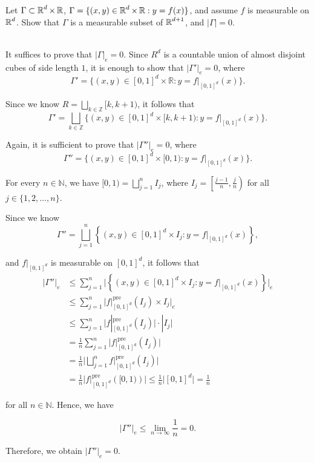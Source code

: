\documentclass[UTF8,a4paper,10pt]{article}
\begin{document}
\pagebreak

\begin{Problem}[]{}
  Let \(\Gamma\subset \operatorname{\mathbb{R}}^d \times\operatorname{\mathbb{R}}\), \(\Gamma = \{(x,y)\in\operatorname{\mathbb{R}}^d\times\operatorname{\mathbb{R}}:y = f(x)\}\), and assume \(f\) is measurable on \(\operatorname{\mathbb{R}}^d\). Show that \(\Gamma\) is a measurable subset of \(\operatorname{\mathbb{R}}^{d+1}\), and \(|\Gamma| = 0.\)
\end{Problem}

\begin{solution}\,\\

  It suffices to prove that $|\Gamma|_e = 0$. Since $R^d$ is a countable union of almost disjoint cubes of side length $1$, it is enough to show that $|\Gamma'|_e = 0$, where 
  \[\Gamma' = \{(x, y) \in [0, 1]^d \times \mathbb{R} : y = f|_{[0,1]^d} (x)\}.\]

  Since we know $R = \bigsqcup _{k\in\mathbb{Z}}[k, k + 1)$, it follows that 
  \[\Gamma' = \bigsqcup_{k\in\mathbb{Z}}\{(x, y) \in [0, 1]^d \times [k, k + 1) : y = f|_{[0,1]^d} (x)\}.\]
  
  Again, it is sufficient to prove that $|\Gamma''|_e = 0$, where 
  \[\Gamma'' = \{(x, y) \in [0, 1]^d \times [0, 1) : y = f|_{[0,1]^d} (x)\}.\]
  
  For every $n \in \mathbb{N}$, we have $[0, 1) = \bigsqcup_{j=1}^n I_j$, where $I_j = \left[\frac{j - 1}{n}, \frac{j}{n}\right)$ for all $j \in \{1, 2, \ldots, n\}$.
  
  Since we know 
 \[\Gamma'' = \bigsqcup_{j=1}^n \left\{(x, y) \in [0, 1]^d \times I_j : y = f|_{[0,1]^d} (x)\right\},\]
  
  and $f|_{[0,1]^d}$ is measurable on $[0, 1]^d$, it follows that
  \begin{align*}
  |\Gamma''|_e &\le \sum_{j=1}^n \bigg|\left\{(x, y) \in [0, 1]^d \times I_j : y = f|_{[0,1]^d} (x)\right\}\bigg|_e \\
  &\le \sum_{j=1}^n \bigg|f|_{[0,1]^d}^{\text{pre}} (I_j) \times I_j \bigg|_e \\
  &\le \sum_{j=1}^n \bigg|f|_{[0,1]^d}^{\text{pre}} (I_j)\bigg| \cdot |I_j| \\
  &= \frac{1}{n} \sum_{j=1}^n \bigg|f|_{[0,1]^d}^{\text{pre}} (I_j)\bigg| \\
  &= \frac{1}{n} \bigg|\bigsqcup_{j=1}^n f|_{[0,1]^d}^{\text{pre}} (I_j)\bigg| \\
  &= \frac{1}{n} \bigg| f|_{[0,1]^d}^{\text{pre}} \left([0,1)\right)\bigg|  \le \frac{1}{n} \bigg|[0, 1]^d\bigg| = \frac{1}{n}
  \end{align*}

  for all $n \in \mathbb{N}$. Hence, we have

  \begin{equation*}
  |\Gamma''|_e \le \lim_{n \to \infty} \frac{1}{n} = 0.
  \end{equation*}

  Therefore, we obtain
  \(|\Gamma''|_e = 0.\)
    
\end{solution}
\end{document}
